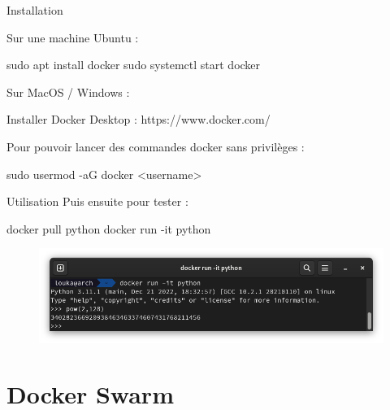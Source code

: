 \documentclass{cubeamer}
\begin{document}
\begin{frame}[fragile]{Installation}
    \begin{multicols}{2}
Sur une machine Ubuntu :
\begin{bashResized}{0.48}
sudo apt install docker
sudo systemctl start docker
\end{bashResized}
    \columnbreak
    
Sur MacOS / Windows :
\begin{bashResized}{0.48}
Installer Docker Desktop :
https://www.docker.com/
\end{bashResized}
    \end{multicols}

    Pour pouvoir lancer des commandes docker sans privilèges :
\begin{bash}
sudo usermod -aG docker <username>
\end{bash}
\end{frame}

\begin{frame}[fragile]{Utilisation}
    Puis ensuite pour tester :
\begin{bash}
docker pull python
docker run -it python
\end{bash}

    \begin{figure}
        \centering
        \includegraphics[width=\textwidth]{img/docker-test.png}
    \end{figure}
\end{frame}

\section{Docker Swarm}
\end{document}
